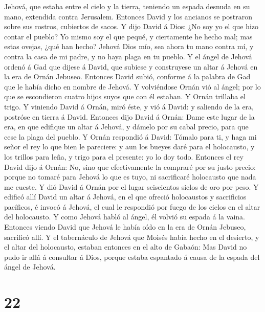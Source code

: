 Jehová, que estaba entre el cielo y la tierra, teniendo un espada
desnuda en su mano, extendida contra Jerusalem. Entonces David y los
ancianos se postraron sobre sus rostros, cubiertos de sacos.
 Y dijo David á Dios: ¿No soy yo el que hizo contar el
pueblo? Yo mismo soy el que pequé, y ciertamente he hecho mal; mas estas
ovejas, ¿qué han hecho? Jehová Dios mío, sea ahora tu mano contra mí, y
contra la casa de mi padre, y no haya plaga en tu pueblo.
 Y el ángel de Jehová ordenó á Gad que dijese á David,
que subiese y construyese un altar á Jehová en la era de Ornán Jebuseo.
 Entonces David subió, conforme á la palabra de Gad que
le había dicho en nombre de Jehová.  Y volviéndose Ornán
vió al ángel; por lo que se escondieron cuatro hijos suyos que con él
estaban. Y Ornán trillaba el trigo.  Y viniendo David á
Ornán, miró éste, y vió á David: y saliendo de la era, postróse en
tierra á David.  Entonces dijo David á Ornán: Dame este
lugar de la era, en que edifique un altar á Jehová, y dámelo por su
cabal precio, para que cese la plaga del pueblo.  Y Ornán
respondió á David: Tómalo para ti, y haga mi señor el rey lo que bien le
pareciere: y aun los bueyes daré para el holocausto, y los trillos para
leña, y trigo para el presente: yo lo doy todo.  Entonces
el rey David dijo á Ornán: No, sino que efectivamente la compraré por su
justo precio: porque no tomaré para Jehová lo que es tuyo, ni
sacrificaré holocausto que nada me cueste.  Y dió David á
Ornán por el lugar seiscientos siclos de oro por peso.  Y
edificó allí David un altar á Jehová, en el que ofreció holocaustos y
sacrificios pacíficos, é invocó á Jehová, el cual le respondió por fuego
de los cielos en el altar del holocausto.  Y como Jehová
habló al ángel, él volvió su espada á la vaina.  Entonces
viendo David que Jehová le había oído en la era de Ornán Jebuseo,
sacrificó allí.  Y el tabernáculo de Jehová que Moisés
había hecho en el desierto, y el altar del holocausto, estaban entonces
en el alto de Gabaón: Mas David no pudo ir allá á consultar á Dios,
porque estaba espantado á causa de la espada del ángel de Jehová.

\hypertarget{section-21}{%
\section{22}\label{section-21}}

